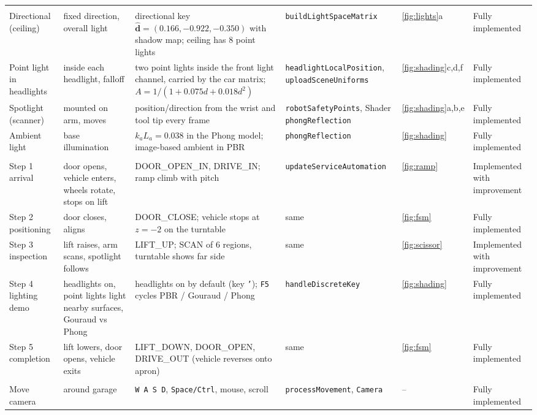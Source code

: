 \documentclass[10pt,a4paper]{article}
\newcommand{\fn}[1]{\texttt{#1}}
\newcommand{\vect}[1]{\mathbf{#1}}
\begin{document}
{\begin{longtable}{@{}>{\raggedright}p{2.3cm}>{\raggedright}p{2.4cm}>{\raggedright}p{4.3cm}>{\raggedright}p{3.2cm}>{\raggedright}p{1.25cm}>{\raggedright\arraybackslash}p{2.3cm}@{}}
\multicolumn{6}{@{}l}{\textbf{Lighting design}}\\
Directional (ceiling) & fixed direction, overall light & directional key $\hat{\vect d}=(0.166,-0.922,-0.350)$ with shadow map; ceiling has 8 point lights & \fn{buildLightSpaceMatrix} & \ref{fig:lights}a & Fully implemented\\
Point light in headlights & inside each headlight, falloff & two point lights inside the front light channel, carried by the car matrix; $A=1/(1{+}0.075d{+}0.018d^2)$ & \fn{headlightLocalPosition}, \fn{uploadSceneUniforms} & \ref{fig:shading}c,d,f & Fully implemented\\
Spotlight (scanner) & mounted on arm, moves & position/direction from the wrist and tool tip every frame & \fn{robotSafetyPoints}, Shader \fn{phongReflection} & \ref{fig:shading}a,b,e & Fully implemented\\
Ambient light & base illumination & $k_aL_a=0.038$ in the Phong model; image-based ambient in PBR & \fn{phongReflection} & \ref{fig:shading} & Fully implemented\\
\multicolumn{6}{@{}l}{\textbf{Animation flow}}\\
Step 1 arrival & door opens, vehicle enters, wheels rotate, stops on lift & DOOR\_OPEN\_IN, DRIVE\_IN; ramp climb with pitch & \fn{updateServiceAutomation} & \ref{fig:ramp} & Implemented with improvement\\
Step 2 positioning & door closes, aligns & DOOR\_CLOSE; vehicle stops at $z=-2$ on the turntable & same & \ref{fig:fsm} & Fully implemented\\
Step 3 inspection & lift raises, arm scans, spotlight follows & LIFT\_UP; SCAN of 6 regions, turntable shows far side & same & \ref{fig:scissor} & Implemented with improvement\\
Step 4 lighting demo & headlights on, point lights light nearby surfaces, Gouraud vs Phong & headlights on by default (key \fn{'}); \fn{F5} cycles PBR / Gouraud / Phong & \fn{handleDiscreteKey} & \ref{fig:shading} & Fully implemented\\
Step 5 completion & lift lowers, door opens, vehicle exits & LIFT\_DOWN, DOOR\_OPEN, DRIVE\_OUT (vehicle reverses onto apron) & same & \ref{fig:fsm} & Fully implemented\\
\multicolumn{6}{@{}l}{\textbf{Interactive features}}\\
Move camera & around garage & \fn{W A S D}, \fn{Space/Ctrl}, mouse, scroll & \fn{processMovement}, \fn{Camera} & -- & Fully implemented\\

\end{longtable}}
\end{document}
